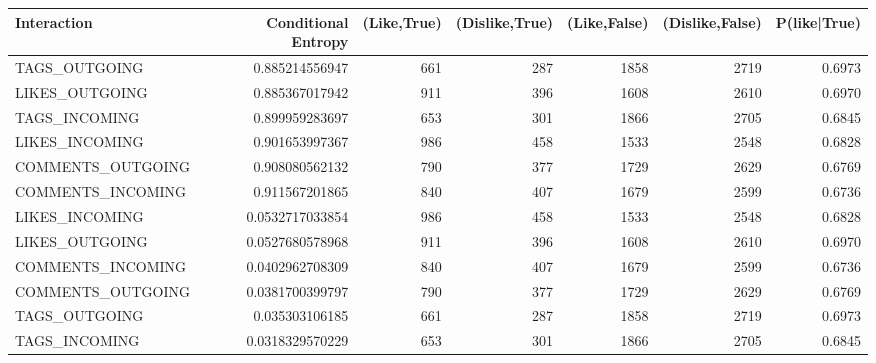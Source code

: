 	
\cleardoublepage
\begin{table}
	\centering
	\begin{tabular}{| >{\small}l | >{\small}r | >{\small}r | >{\small}r | >{\small}r | >{\small}r | >{\small}r |}
		\hline
		Interaction & Conditional Entropy & (Like,True) & (Dislike,True) & (Like,False) & (Dislike,False)  & P(like|True)\\
		\hline
		TAGS\_OUTGOING & 0.885214556947 & 661 & 287 & 1858 & 2719  & 0.6973\\
		LIKES\_OUTGOING & 0.885367017942 & 911 & 396 & 1608 & 2610 & 0.6970\\
		TAGS\_INCOMING & 0.899959283697 & 653 & 301 & 1866 & 2705 & 0.6845\\
		LIKES\_INCOMING & 0.901653997367 & 986 & 458 & 1533 & 2548 & 0.6828\\
		COMMENTS\_OUTGOING & 0.908080562132 & 790 & 377 & 1729 & 2629 & 0.6769\\
		COMMENTS\_INCOMING & 0.911567201865 & 840 & 407 & 1679 & 2599 & 0.6736\\
		\hline
		\hline
		\hline
		LIKES\_INCOMING & 0.0532717033854 & 986 & 458 & 1533 & 2548 &  0.6828\\
		LIKES\_OUTGOING & 0.0527680578968 & 911 & 396 & 1608 & 2610 & 0.6970\\
		COMMENTS\_INCOMING & 0.0402962708309 & 840 & 407 & 1679 & 2599 & 0.6736\\
		COMMENTS\_OUTGOING & 0.0381700399797 & 790 & 377 & 1729 & 2629 & 0.6769\\
		TAGS\_OUTGOING & 0.035303106185 & 661 & 287 & 1858 & 2719 & 0.6973\\
		TAGS\_INCOMING & 0.0318329570229 & 653 & 301 & 1866 & 2705 & 0.6845\\
		\hline
		

\end{tabular}
\end{table}
